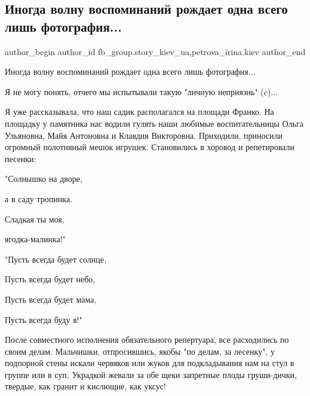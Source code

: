  
 
 
 
 
 
\subsection{Иногда волну воспоминаний рождает одна всего лишь фотография...}
\label{sec:06_07_2020.fb.fb_group.story_kiev_ua.1.fotografia_vospominania}
 
\ifcmt
 author_begin
   author_id fb_group.story_kiev_ua,petrova_irina.kiev
 author_end
\fi

Иногда волну воспоминаний рождает одна всего лишь фотография...

Я не могу понять, отчего мы испытывали такую "личную неприязнь" (c)...

Я уже рассказывала, что наш садик располагался на площади Франко. На площадку у
памятника нас водили гулять наши любимые воспитательницы Ольга Ульяновна, Майя
Антоновна и Клавдия Викторовна. Приходили, приносили огромный полотняный мешок
игрушек. Становились в хоровод и репетировали песенки:

"Солнышко  на дворе,

а в саду тропинка.

 Сладкая ты моя,

ягодка-малинка!"

"Пусть всегда будет солнце,

 Пусть всегда будет небо,

 Пусть всегда будет мама,

 Пусть всегда буду я!"

После совместного исполнения обязательного репертуара, все расходились по своим
делам. Мальчишки, отпросившись, якобы "по делам, за лесенку",  у подпорной
стены искали червяков или жуков для подкладывания нам на стул в группе или в
суп. Украдкой жевали за обе щеки запретные плоды груши-дички, твердые, как
гранит и кислющие, как уксус!

